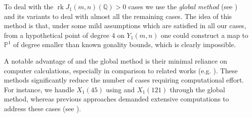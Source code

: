 \documentclass[11pt,reqno]{amsart}
\DeclareMathOperator{\rk}{rk}
\theoremstyle{definition}
\numberwithin{equation}{section}
\newcommand{\Q}{\mathbb{Q}}
\newcommand{\PP}{\mathbb{P}}
\begin{document}
To deal with the $\rk J_1(m,n)(\Q)>0$ cases we use the \textit{global method} (see ) and its variants to deal with almost all the remaining cases. The idea of this method is that, under some mild assumptions which are satisfied in all our cases, from a hypothetical point of degree $4$ on $Y_1(m,n)$ one could construct a map to $\PP^1$ of degree smaller than known gonality bounds, which is clearly impossible. 

A notable advantage of  and the global method is their minimal reliance on computer calculations, especially in comparison to related works (e.g. \cite{Deg3Class}). These methods significantly reduce the number of cases requiring computational effort. For instance, we handle $X_1(45)$ using  and $X_1(121)$ through the global method, whereas previous approaches demanded extensive computations to address these cases (see \cite{Deg3Class}).




\end{document}
